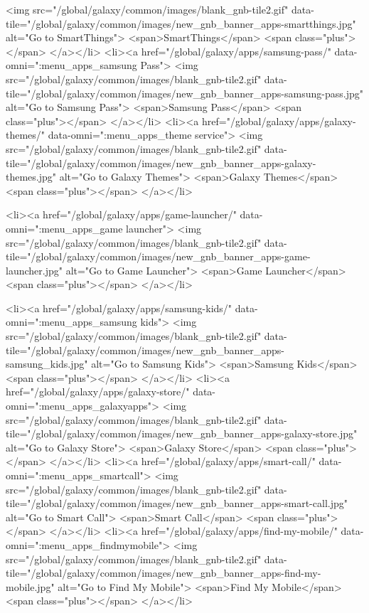 								<img src="/global/galaxy/common/images/blank_gnb-tile2.gif"
									data-tile="/global/galaxy/common/images/new_gnb_banner_apps-smartthings.jpg"
									alt="Go to SmartThings">
								<span>SmartThings</span>
								<span class="plus"></span>
							</a></li>
							<li><a href="/global/galaxy/apps/samsung-pass/" data-omni=":menu_apps_samsung Pass">
								<img src="/global/galaxy/common/images/blank_gnb-tile2.gif"
									data-tile="/global/galaxy/common/images/new_gnb_banner_apps-samsung-pass.jpg"
									alt="Go to Samsung Pass">
								<span>Samsung Pass</span>
								<span class="plus"></span>
							</a></li>
							<li><a href="/global/galaxy/apps/galaxy-themes/" data-omni=":menu_apps_theme service">
								<img src="/global/galaxy/common/images/blank_gnb-tile2.gif"
									data-tile="/global/galaxy/common/images/new_gnb_banner_apps-galaxy-themes.jpg"
									alt="Go to Galaxy Themes">
								<span>Galaxy Themes</span>
								<span class="plus"></span>
							</a></li>

							<li><a href="/global/galaxy/apps/game-launcher/" data-omni=":menu_apps_game launcher">
								<img src="/global/galaxy/common/images/blank_gnb-tile2.gif"
									data-tile="/global/galaxy/common/images/new_gnb_banner_apps-game-launcher.jpg"
									alt="Go to Game Launcher">
								<span>Game Launcher</span>
								<span class="plus"></span>
							</a></li>

							<li><a href="/global/galaxy/apps/samsung-kids/" data-omni=":menu_apps_samsung kids">
								<img src="/global/galaxy/common/images/blank_gnb-tile2.gif"
									data-tile="/global/galaxy/common/images/new_gnb_banner_apps-samsung_kids.jpg"
									alt="Go to Samsung Kids">
								<span>Samsung Kids</span>
								<span class="plus"></span>
							</a></li>
							<li><a href="/global/galaxy/apps/galaxy-store/" data-omni=":menu_apps_galaxyapps">
								<img src="/global/galaxy/common/images/blank_gnb-tile2.gif"
									data-tile="/global/galaxy/common/images/new_gnb_banner_apps-galaxy-store.jpg"
									alt="Go to Galaxy Store">
								<span>Galaxy Store</span>
								<span class="plus"></span>
							</a></li>
							<li><a href="/global/galaxy/apps/smart-call/" data-omni=":menu_apps_smartcall">
								<img src="/global/galaxy/common/images/blank_gnb-tile2.gif"
									data-tile="/global/galaxy/common/images/new_gnb_banner_apps-smart-call.jpg"
									alt="Go to Smart Call">
								<span>Smart Call</span>
								<span class="plus"></span>
							</a></li>
							<li><a href="/global/galaxy/apps/find-my-mobile/" data-omni=":menu_apps_findmymobile">
								<img src="/global/galaxy/common/images/blank_gnb-tile2.gif"
									data-tile="/global/galaxy/common/images/new_gnb_banner_apps-find-my-mobile.jpg"
									alt="Go to Find My Mobile">
								<span>Find My Mobile</span>
								<span class="plus"></span>
							</a></li>

